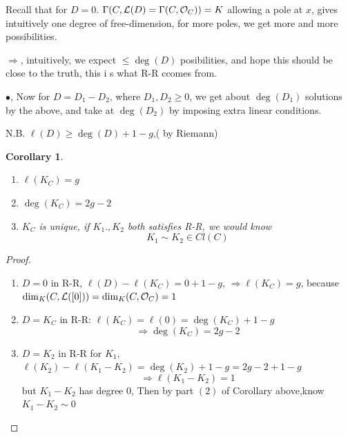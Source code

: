 \documentclass[11pt]{article}
\newtheorem{cor}[thm]{Corollary}
\newcommand{\call}{{\cal L}}
\newcommand{\calo}{{\cal O}}
\newcommand{\Lrta}{\Longrightarrow}
\begin{document}
 Recall that for $D=0$. $\Gamma(C,\call(D)=\Gamma(C,\calo_C))=K$ allowing a pole at $x$, gives intuitively one degree of free-dimension, for more poles, we get more and more possibilities.

 $\Lrta$, intuitively, we expect $\leq \deg(D)$ posibilities, and hope this should be close to the truth, this i s what R-R ccomes from.

 $\bullet$, Now for $D=D_1-D_2$, where $D_1,D_2\geq 0$, we get about $\deg(D_1)$ solutions by the above, and take at $\deg(D_2)$ by imposing extra linear conditions.

 N.B. $\ell(D)\geq \deg(D)+1-g$,( by Riemann)

 \begin{cor}
\begin{enumerate}[label=(\arabic*)]
\item $\ell(K_C)=g$
\item $\deg(K_C)=2g-2$
\item $K_C$ is unique, if $K_1.,K_2$ both satisfies R-R, we would know
$$
K_1\sim K_2\in Cl(C)
$$
\end{enumerate}
 \end{cor}
 \begin{proof}
 \begin{enumerate}[label=\arabic*]
 \item $D=0$ in R-R, $\ell(D)-\ell(K_C)=0+1-g$, $\Lrta \ell(K_C)=g$, because $\dim_K(C,\call([0]))=\dim_K(C,\calo_C)=1$
 \item $D=K_C$ in R-R: $\ell(K_C)=\ell(0)=\deg(K_C)+1-g$
 $$
\Lrta \deg(K_C)=2g-2
 $$
\item $D=K_2$ in R-R for $K_1$, $\ell(K_2)-\ell(K_1-K_2)=\deg(K_2)+1-g=2g-2+1-g$
$$
\Lrta \ell(K_1-K_2)=1
$$
but $K_1-K_2$ has degree $0$, Then by part $(2)$ of Corollary above,know
$K_1-K_2\sim 0$
 \end{enumerate}
 \end{proof}
\end{document}
